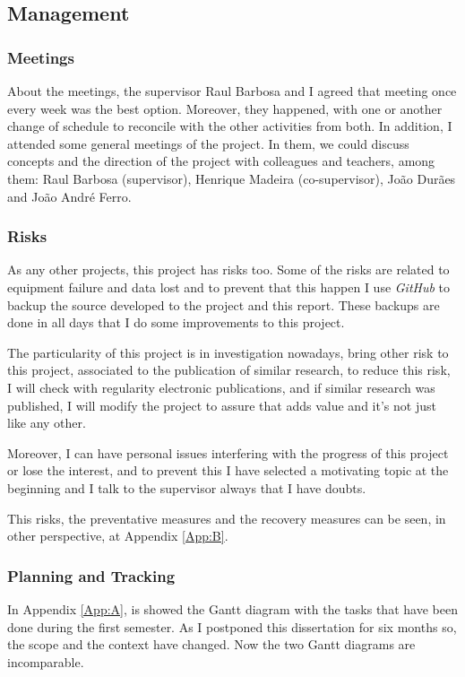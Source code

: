 \subsection{Management}


\subsubsection{Meetings}
About the meetings, the supervisor Raul Barbosa and I agreed that meeting once every week was the best option. Moreover, they happened, with one or another change of schedule to reconcile with the other activities from both. In addition, I attended some general meetings of the project. In them, we could discuss concepts and the direction of the project with colleagues and teachers, among them: Raul Barbosa (supervisor), Henrique Madeira (co-supervisor), João Durães and João André Ferro.

\subsubsection{Risks}

As any other projects, this project has risks too.
Some of the risks are related to equipment failure and data lost and to prevent that this happen I use \textit{GitHub} to backup the source developed to the project and this report. These backups are done in all days that I do some improvements to this project.

The particularity of this project is in investigation nowadays, bring other risk to this project, associated to the publication of similar research, to reduce this risk, I will check with regularity electronic publications, and if similar research was published, I will modify the project to assure that adds value and it's not just like any other.

Moreover, I can have personal issues interfering with the progress of this project or lose the interest, and to prevent this I have selected a motivating topic at the beginning and I talk to the supervisor always that I have doubts.

This risks, the preventative measures and the recovery measures can be seen, in other perspective, at Appendix \ref{App:B}.

\subsubsection{Planning and Tracking}
In Appendix \ref{App:A}, is showed the Gantt diagram with the tasks that have been done during the first semester.
As I postponed this dissertation for six months so, the scope and the context have changed. Now the two Gantt diagrams are incomparable.


